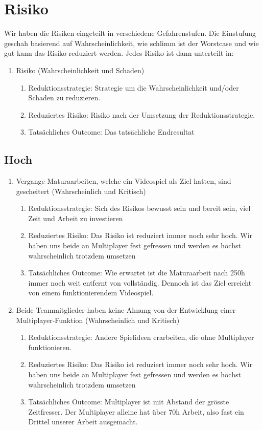 \chapter{Risiko}
Wir haben die Risiken eingeteilt in verschiedene Gefahrenstufen.
Die Einstufung geschah basierend auf Wahrscheinlichkeit, wie schlimm ist der Worstcase und wie gut kann das Risiko reduziert werden.
Jedes Risiko ist dann unterteilt in:
\begin{enumerate}
    \item Risiko (Wahrscheinlichkeit und Schaden)
    \begin{enumerate}
        \item Reduktionsstrategie: Strategie um die Wahrscheinlichkeit und/oder Schaden zu reduzieren.
        \item Reduziertes Risiko: Risiko nach der Umsetzung der Reduktionsstrategie.
        \item Tatsächliches Outcome: Das tatsächliche Endresultat
    \end{enumerate}
\end{enumerate}

\section{Hoch}
\begin{enumerate}
    \item Vergange Maturaarbeiten, welche ein Videospiel als Ziel hatten, sind gescheitert (Wahrscheinlich und Kritisch)
    \begin{enumerate}
        \item Reduktionsstrategie: Sich des Risikos bewusst sein und bereit sein, viel Zeit und Arbeit zu investieren
        \item Reduziertes Risiko: Das Risiko ist reduziert immer noch sehr hoch.
            Wir haben uns beide an Multiplayer fest gefressen und werden es höchst wahrscheinlich trotzdem umsetzen
        \item Tatsächliches Outcome: Wie erwartet ist die Maturaarbeit nach 250h immer noch weit entfernt von vollständig.
            Dennoch ist das Ziel erreicht von einem funktionierendem Videospiel.
    \end{enumerate}

    \item Beide Teammitglieder haben keine Ahnung von der Entwicklung einer Multiplayer-Funktion (Wahrscheinlich und Kritisch)
    \begin{enumerate}
        \item Reduktionsstrategie: Andere Spielideen erarbeiten, die ohne Multiplayer funktionieren.
        \item Reduziertes Risiko: Das Risiko ist reduziert immer noch sehr hoch.
              Wir haben uns beide an Multiplayer fest gefressen und werden es höchst wahrscheinlich trotzdem umsetzen
        \item Tatsächliches Outcome: Multiplayer ist mit Abstand der grösste Zeitfresser.
              Der Multiplayer alleine hat über 70h Arbeit, also fast ein Drittel unserer Arbeit ausgemacht.
    \end{enumerate}
\end{enumerate}

